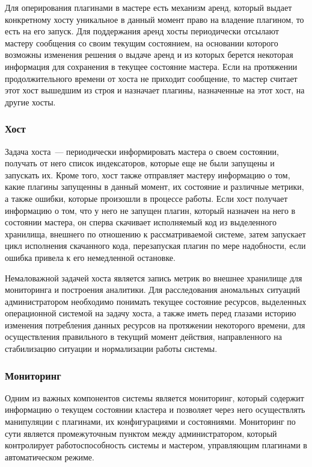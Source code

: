 Для оперирования плагинами в мастере есть механизм аренд, который выдает конкретному хосту уникальное в данный момент право на владение плагином, то есть на его запуск. Для поддержания аренд хосты периодически отсылают мастеру сообщения со своим текущим состоянием, на основании которого возможны изменения решения о выдаче аренд и из которых берется некоторая информация для сохранения в текущее состояние мастера. Если на протяжении продолжительного времени от хоста не приходит сообщение, то мастер считает этот хост вышедшим из строя и назначает плагины, назначенные на этот хост, на другие хосты.

\subsubsection{Хост}

Задача хоста~--- периодически информировать мастера о своем состоянии, получать от него список индексаторов, которые еще не были запущены и запускать их. Кроме того, хост также отправляет мастеру информацию о том, какие плагины запущенны в данный момент, их состояние и различные метрики, а также ошибки, которые произошли в процессе работы. Если хост получает информацию о том, что у него не запущен плагин, который назначен на него в состоянии мастера, он сперва скачивает исполняемый код из выделенного хранилища, внешнего по отношению к рассматриваемой системе, затем запускает цикл исполнения скачанного кода, перезапуская плагин по мере надобности, если ошибка привела к его немедленной остановке.

Немаловажной задачей хоста является запись метрик во внешнее хранилище для мониторинга и построения аналитики. Для расследования аномальных ситуаций администратором необходимо понимать текущее состояние ресурсов, выделенных операционной системой на задачу хоста, а также иметь перед глазами историю изменения потребления данных ресурсов на протяжении некоторого времени, для осуществления правильного в текущий момент действия, направленного на стабилизацию ситуации и нормализации работы системы.

\subsubsection{Мониторинг}

Одним из важных компонентов системы является мониторинг, который содержит информацию о текущем состоянии кластера и позволяет через него осуществлять манипуляции с плагинами, их конфигурациями и состояниями. Мониторинг по сути является промежуточным пунктом между администратором, который контролирует работоспособность системы и мастером, управляющим плагинами в автоматическом режиме. 

\clearpage
